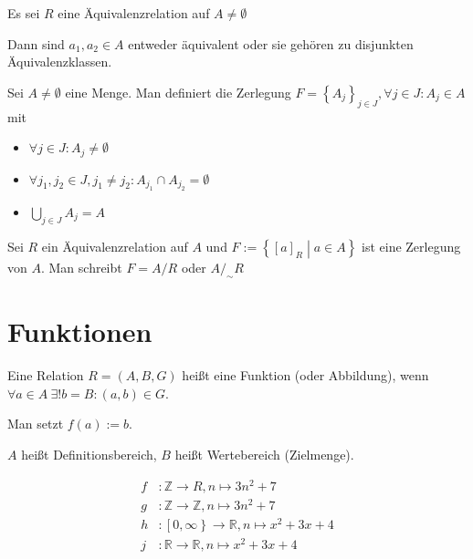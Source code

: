 \begin{corollary}
  Es sei $R$ eine Äquivalenzrelation auf $A \ne \emptyset$

  Dann sind $a_1, a_2 \in A$ entweder äquivalent oder sie gehören zu disjunkten Äquivalenzklassen.
\end{corollary}
\begin{remark}
  Sei $A \ne \emptyset$ eine Menge. Man definiert die Zerlegung $F = \left\{ A_j \right\}_{j \in J}, \forall j \in J: A_j \in A$ mit
  \begin{itemize}
  \item $\forall j \in J: A_j \ne \emptyset$
  \item $\forall j_1, j_2 \in J, j_1 \ne j_2: A_{j_1} \cap A_{j_2} = \emptyset$
  \item $\bigcup_{j \in J} A_j = A$
  \end{itemize}

  Sei $R$ ein Äquivalenzrelation auf $A$ und $F:= \left\{ [a]_R \middle| a \in A \right\}$ ist eine Zerlegung von $A$. Man schreibt $F = A / R$ oder $A /_{\sim} R$\index[sym]{$/$}\index[sym]{$/_{\sim}$}
\end{remark}


\section{Funktionen}
\begin{definition}
  Eine Relation $R = (A, B, G)$ heißt eine Funktion (oder Abbildung), wenn $\forall a \in A\: \exists! b = B: (a, b) \in G$.

  Man setzt $f(a) := b$.

  $A$ heißt Definitionsbereich, $B$ heißt Wertebereich (Zielmenge).
\end{definition}
\begin{example}
  \begin{align*}
    f&: \mathbb{Z} \to R, n \mapsto 3n^2+7 \\
    g&: \mathbb{Z} \to \mathbb{Z}, n \mapsto 3n^2+7 \\
    h&: \left[0, \infty\right\} \to \mathbb{R}, n \mapsto x^2+3x+4 \\
    j&: \mathbb{R} \to \mathbb{R}, n \mapsto x^2+3x+4
  \end{align*}
\end{example}

